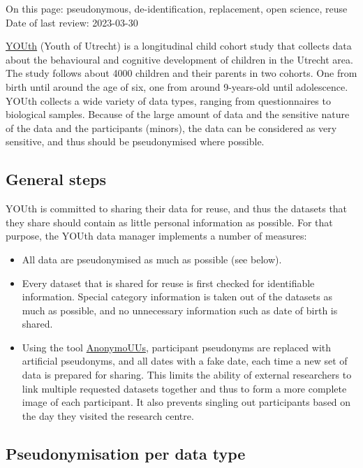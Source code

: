 \documentclass[
]{book}
\providecommand{\tightlist}{%
  \setlength{\itemsep}{0pt}\setlength{\parskip}{0pt}}
\begin{document}
On this page: pseudonymous, de-identification, replacement, open science, reuse\\
Date of last review: 2023-03-30

\href{https://www.uu.nl/en/research/youth-cohort-study}{YOUth}
(Youth of Utrecht) is a longitudinal child cohort study that collects data about
the behavioural and cognitive development of children in the Utrecht area. The
study follows about 4000 children and their parents in two cohorts. One from
birth until around the age of six, one from around 9-years-old until adolescence.
YOUth collects a wide variety of data types, ranging from questionnaires to
biological samples. Because of the large amount of data and the sensitive nature
of the data and the participants (minors), the data can be considered as very
sensitive, and thus should be pseudonymised where possible.

\hypertarget{general-steps}{%
\subsection{General steps}\label{general-steps}}

YOUth is committed to sharing their data for reuse, and thus the datasets that
they share should contain as little personal information as possible. For that
purpose, the YOUth data manager implements a number of measures:

\begin{itemize}
\tightlist
\item
  All data are pseudonymised as much as possible (see below).
\item
  Every dataset that is shared for reuse is first checked for identifiable
  information. Special category information is taken out of the datasets as much
  as possible, and no unnecessary information such as date of birth is shared.
\item
  Using the tool
  \href{https://github.com/UtrechtUniversity/anonymouus}{AnonymoUUs},
  participant pseudonyms are replaced with artificial pseudonyms, and all
  dates with a fake date, each time a new set of data is prepared for sharing.
  This limits the ability of external researchers to link multiple requested
  datasets together and thus to form a more complete image of each participant.
  It also prevents singling out participants based on the day they visited the
  research centre.
\end{itemize}

\hypertarget{pseudonymisation-per-data-type}{%
\subsection{Pseudonymisation per data type}\label{pseudonymisation-per-data-type}}
\end{document}
